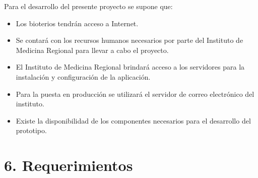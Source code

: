 \documentclass[
11pt, %
]{charter}
\begin{document}
Para el desarrollo del presente proyecto se supone que:
\begin{itemize}
	\item Los bioterios tendrán acceso a Internet.
	\item Se contará con los recursos humanos necesarios por parte del Instituto de Medicina Regional para llevar a cabo el proyecto.
	\item El Instituto de Medicina Regional brindará acceso a los servidores para la instalación y configuración de la aplicación.
	\item Para la puesta en producción se utilizará el servidor de correo electrónico del instituto.
	\item Existe la disponibilidad de los componentes necesarios para el desarrollo del prototipo.
\end{itemize}

\section{6. Requerimientos}
\label{sec:requerimientos}
\end{document}
